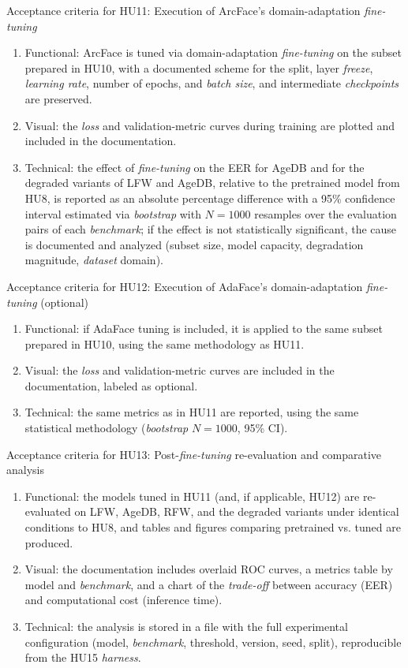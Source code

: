 \documentclass[
  11pt, %
]{charter}
\begin{document}
Acceptance criteria for HU11: Execution of ArcFace's domain-adaptation \textit{fine-tuning}
\begin{enumerate}
  \item Functional: ArcFace is tuned via domain-adaptation \textit{fine-tuning} on the subset prepared in HU10, with a documented scheme for the split, layer \textit{freeze}, \textit{learning rate}, number of epochs, and \textit{batch size}, and intermediate \textit{checkpoints} are preserved.
  \item Visual: the \textit{loss} and validation-metric curves during training are plotted and included in the documentation.
  \item Technical: the effect of \textit{fine-tuning} on the EER for AgeDB and for the degraded variants of LFW and AgeDB, relative to the pretrained model from HU8, is reported as an absolute percentage difference with a 95\% confidence interval estimated via \textit{bootstrap} with $N=1000$ resamples over the evaluation pairs of each \textit{benchmark}; if the effect is not statistically significant, the cause is documented and analyzed (subset size, model capacity, degradation magnitude, \textit{dataset} domain).
\end{enumerate}

Acceptance criteria for HU12: Execution of AdaFace's domain-adaptation \textit{fine-tuning} (optional)
\begin{enumerate}
  \item Functional: if AdaFace tuning is included, it is applied to the same subset prepared in HU10, using the same methodology as HU11.
  \item Visual: the \textit{loss} and validation-metric curves are included in the documentation, labeled as optional.
  \item Technical: the same metrics as in HU11 are reported, using the same statistical methodology (\textit{bootstrap} $N=1000$, 95\% CI).
\end{enumerate}

Acceptance criteria for HU13: Post-\textit{fine-tuning} re-evaluation and comparative analysis
\begin{enumerate}
  \item Functional: the models tuned in HU11 (and, if applicable, HU12) are re-evaluated on LFW, AgeDB, RFW, and the degraded variants under identical conditions to HU8, and tables and figures comparing pretrained vs. tuned are produced.
  \item Visual: the documentation includes overlaid ROC curves, a metrics table by model and \textit{benchmark}, and a chart of the \textit{trade-off} between accuracy (EER) and computational cost (inference time).
  \item Technical: the analysis is stored in a file with the full experimental configuration (model, \textit{benchmark}, threshold, version, seed, split), reproducible from the HU15 \textit{harness}.
\end{enumerate}
\end{document}
